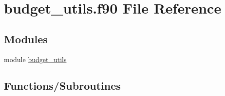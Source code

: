 \hypertarget{budget__utils_8f90}{}\section{budget\+\_\+utils.\+f90 File Reference}
\label{budget__utils_8f90}
\subsection*{Modules}
\begin{DoxyCompactItemize}
\item 
module \hyperlink{namespacebudget__utils}{budget\+\_\+utils}
\end{DoxyCompactItemize}
\subsection*{Functions/\+Subroutines}
